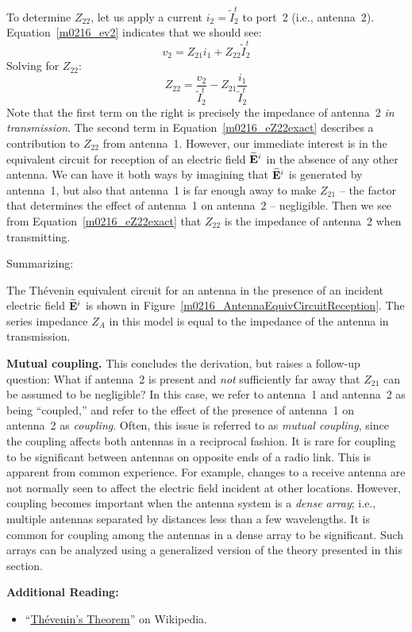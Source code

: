 To determine $Z_{22}$, 
let us apply a current $i_2=\widetilde{I}_2^t$ to port~2 (i.e., antenna~2).
Equation~\ref{m0216_ev2} indicates that we should see:
%
\begin{equation}
v_2 = Z_{21} i_1 + Z_{22} \widetilde{I}_2^t
\end{equation}
%
Solving for $Z_{22}$:
%
\begin{equation}
Z_{22} = \frac{v_2}{\widetilde{I}_2^t} - Z_{21} \frac{i_1}{\widetilde{I}_2^t} 
\label{m0216_eZ22exact} 
\end{equation}
%
Note that the first term on the right is precisely the impedance of antenna~2 \emph{in transmission}. 
The second term in Equation~\ref{m0216_eZ22exact} describes a contribution to $Z_{22}$ from antenna~1.
However, our immediate interest is in the equivalent circuit for reception of an electric field $\widetilde{\bf E}^i$ in the absence of any other antenna.
We can have it both ways by imagining that $\widetilde{\bf E}^i$ is generated by antenna~1, but also that antenna~1 is far enough away to make $Z_{21}$ -- the factor that determines the effect of antenna~1 on antenna~2 -- negligible.  Then we see from Equation~\ref{m0216_eZ22exact} that $Z_{22}$ is the impedance of antenna~2 when transmitting.

\vspace{1in} %

Summarizing:  
%
\begin{mdframed}[backgroundcolor=yellow!20,nobreak=true] 
The Th\'{e}venin equivalent circuit for an antenna in the presence of an incident electric field $\widetilde{\bf E}^i$ is shown in Figure~\ref{m0216_AntennaEquivCircuitReception}.  The series impedance $Z_A$ in this model is equal to the impedance of the antenna in transmission.
\end{mdframed}

{\bf Mutual coupling.}
This concludes the derivation, but raises a follow-up question:
What if antenna~2 is present and \emph{not} sufficiently far away that $Z_{21}$ can be assumed to be negligible?
In this case, we refer to antenna~1 and antenna~2 as being ``coupled,'' and refer to the effect of the presence of antenna~1 on antenna~2 as \emph{coupling}.
Often, this issue is referred to as \emph{mutual coupling}, since the coupling affects both antennas in a reciprocal fashion.
It is rare for coupling to be significant between antennas on opposite ends of a radio link.
This is apparent from common experience.  For example, changes to a receive antenna are not normally seen to affect the electric field incident at other locations.
However, coupling becomes important when the antenna system is a \emph{dense array}; i.e., multiple antennas separated by distances less than a few wavelengths.
It is common for coupling among the antennas in a dense array to be significant.
Such arrays can be analyzed using a generalized version of the theory presented in this section.


{\bf Additional Reading:}
\begin{itemize}
\item ``\href{https://en.wikipedia.org/wiki/Th%C3%A9venin%27s_theorem}{Th\'{e}venin's Theorem}'' on Wikipedia.
\end{itemize}


